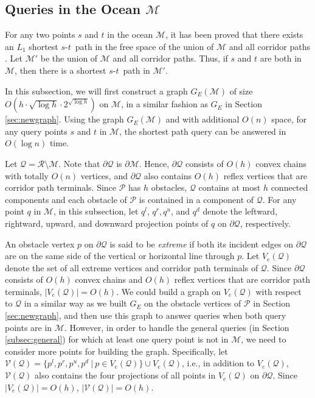 \documentclass[english,runningheads,11pt]{llncs}
\def\calP{\mathcal{P}}
\def\calM{\mathcal{M}}
\def\calR{\mathcal{R}}
\def\calQ{\mathcal{Q}}
\def\calV{\mathcal{V}}
\def\st{$s$-$t$}
\begin{document}
\subsection{Queries in the Ocean $\calM$}

For any two points $s$ and $t$ in the ocean $\calM$, it has been
proved that there exists an $L_1$ shortest \st\ path in the free space of the union of $\calM$
and all corridor paths \cite{ref:ChenA11ESA,ref:ChenCo12arXiv,ref:ChenL113STACS}.
Let $\calM'$ be the union of $\calM$
and all corridor paths. Thus, if $s$ and $t$ are both in $\calM$, then there is a shortest \st\ path in $\calM'$.

In this subsection, we will first construct a graph $G_E(\calM)$ of
size $O(h\cdot \sqrt{\log h} \cdot 2^{\sqrt{\log h}})$ on
$\calM$, in a similar fashion as $G_E$ in
Section \ref{sec:newgraph}. Using the graph $G_E(\calM)$ and with
additional $O(n)$ space, for any query points $s$ and $t$ in $\calM$, the
shortest path query can be answered in $O(\log n)$ time.


Let $\calQ=\calR\setminus\calM$. Note that $\partial\calQ$ is $\partial\calM$.
Hence, $\partial\calQ$ consists of $O(h)$ convex chains with totally $O(n)$ vertices,
and $\partial\calQ$ also contains $O(h)$ reflex vertices that are
corridor path terminals. Since $\calP$ has $h$ obstacles,
$\calQ$ contains at most $h$ connected components and each
obstacle of $\calP$ is contained in a component of $\calQ$.
For any point $q$ in $\calM$, in this subsection, let $q^l$,
$q^r,q^u$, and $q^d$ denote the leftward, rightward,
upward, and downward projection points of $q$ on $\partial\calQ$, respectively.

An obstacle vertex $p$ on $\partial\calQ$ is said to be {\em extreme} if both its
incident edges on $\partial\calQ$ are on the same side of the vertical or horizontal line through $p$. Let $V_e(\calQ)$ denote the set of all extreme vertices and corridor
path terminals of $\calQ$. Since $\partial\calQ$ consists of $O(h)$
convex chains and $O(h)$ reflex vertices that are corridor path
terminals, $|V_e(\calQ)|=O(h)$.  We could build a graph
on $V_e(\calQ)$ with respect to $\calQ$ in a similar way as we built
$G_E$ on the obstacle vertices of $\calP$ in Section \ref{sec:newgraph},
and then use this graph to answer queries when both query points are in
$\calM$. However, in order to handle the general queries (in
Section \ref{subsec:general}) for which at least one query point is not in
$\calM$, we need to consider more points for building the graph.
Specifically, let $\calV(\calQ)=\{p^l,p^r, p^u, p^d \ |\ p\in V_e(\calQ)\} \cup
V_e(\calQ)$, i.e., in addition to $V_e(\calQ)$,
$\calV(\calQ)$ also contains the four projections of all points in
$V_e(\calQ)$ on $\partial\calQ$.
Since $|V_e(\calQ)|=O(h)$, $|\calV(\calQ)|=O(h)$.
\end{document}
